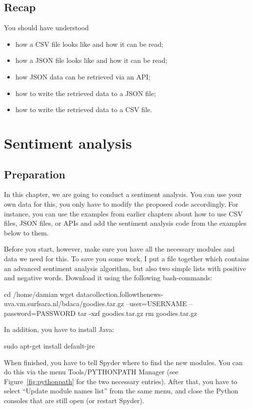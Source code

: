 \documentclass[a4paper,12pt]{book}
\begin{document}
\section{Recap}
You should have understood 
\begin{itemize}
\item how a CSV file looks like and how it can be read;
\item how a JSON file looks like and how it can be read;
\item how JSON data can be retrieved via an API;
\item how to write the retrieved data to a JSON file;
\item how to write the retrieved data to a CSV file.
\end{itemize}


\chapter{Sentiment analysis}
\section{Preparation}
\label{goodies}
In this chapter, we are going to conduct a sentiment analysis. You can use your own data for this, you only have to modify the proposed code accordingly. For instance, you can use the examples from earlier chapters about how to use CSV files, JSON files, or APIs and add the sentiment analysis code from the examples below to them.

Before you start, however, make sure you have all the necessary modules and data we need for this. To save you some work, I put a file together which contains an advanced sentiment analysis algorithm, but also two simple lists with positive and negative words. Download it using the following bash-commands:

\begin{lstlistingbash}
cd /home/damian
wget datacollection.followthenews-uva.vm.surfsara.nl/bdaca/goodies.tar.gz --user=USERNAME --password=PASSWORD
tar -xzf goodies.tar.gz
rm goodies.tar.gz
\end{lstlistingbash}

In addition, you have to install Java:
\begin{lstlistingbash}
sudo apt-get install default-jre
\end{lstlistingbash}

When finished, you have to tell Spyder where to find the new modules. You can do this via the menu Tools/PYTHONPATH Manager (see Figure~\ref{fig:pythonpath} for the two necessary entries). After that, you have to select ``Update module names list'' from the same menu, and close the Python consoles that are still open (or restart Spyder).
\end{document}
